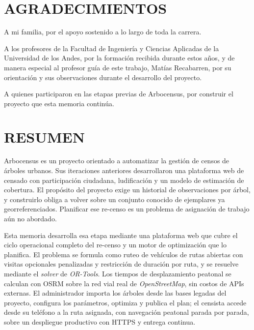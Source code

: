 \setcounter{page}{2}

\chapter*{AGRADECIMIENTOS}

{
\itshape

A mi familia, por el apoyo sostenido a lo largo de toda la carrera.

A los profesores de la Facultad de Ingeniería y Ciencias Aplicadas de la Universidad de los Andes,
por la formación recibida durante estos años, y de manera especial al profesor guía de este trabajo,
Matías Recabarren, por su orientación y sus observaciones durante el desarrollo del proyecto.

A quienes participaron en las etapas previas de Arbocensus, por construir el proyecto que esta
memoria continúa.
}

\newpage

\tableofcontents
\newpage

{}
\listoftables
\newpage

{}
\listoffigures
\newpage

\chapter*{RESUMEN}

Arbocensus es un proyecto orientado a automatizar la gestión de censos de árboles urbanos. Sus
iteraciones anteriores desarrollaron una plataforma web de censado
con participación ciudadana, ludificación y un modelo de estimación de cobertura. El propósito del
proyecto exige un historial de observaciones por árbol, y construirlo obliga a volver sobre un
conjunto conocido de ejemplares ya georreferenciados. Planificar ese re-censo es un problema de
asignación de trabajo aún no abordado.

Esta memoria desarrolla esa etapa mediante una plataforma web que cubre el ciclo operacional
completo del re-censo y un motor de optimización que lo planifica. El problema se formula como
ruteo de vehículos de rutas abiertas con visitas opcionales penalizadas y restricción de
duración por ruta, y se resuelve mediante el \textit{solver} de \textit{OR-Tools}. Los tiempos de
desplazamiento peatonal se calculan con OSRM sobre
la red vial real de \textit{OpenStreetMap}, sin costos de APIs externas. El
administrador importa los árboles desde las bases legadas del proyecto, configura los parámetros,
optimiza y publica el plan; el censista accede desde su teléfono a la ruta asignada, con
navegación peatonal parada por parada, sobre un despliegue productivo con HTTPS y
entrega continua.

